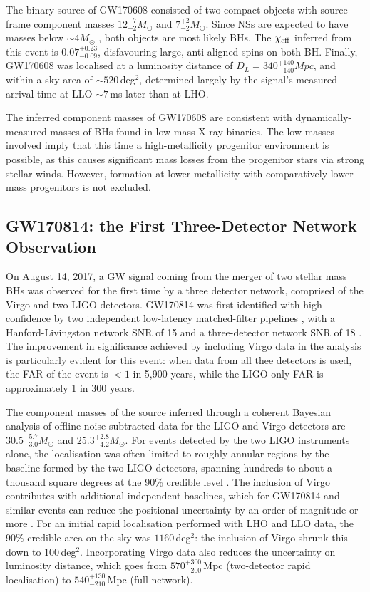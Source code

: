 \documentclass[binding=0.6cm, LaM]{sapthesis}
\begin{document}
	The binary source of GW170608 consisted of two compact objects with source-frame component masses 
	$12^{+7}_{-2}M_\odot$ and $7^{+2}_{-2}M_\odot$.
	Since NSs are expected to have masses below $\sim 4M_\odot$ \cite{141},
	both objects are most likely BHs. 
	The $\chi_{\rm eff}$ inferred from this event is $0.07^{+0.23}_{−0.09}$,
	disfavouring large, anti-aligned spins on both BH.
        Finally, GW170608 was localised at a luminosity distance of $D_L = 340^{+140}_{−140}Mpc$, 
	and within a sky area of $\sim 520\,$deg$^2$, determined largely by the signal's measured arrival time at LLO $\sim 7$\,ms later than at LHO.
 
	The inferred component masses of GW170608 are consistent with 
	dynamically-measured masses of BHs found in low-mass X-ray binaries.
	The low masses involved imply that this time a high-metallicity progenitor environment is possible, 
	as this causes significant mass losses from the progenitor stars via strong stellar winds.
	However, formation at lower metallicity with comparatively lower mass progenitors is not excluded.

\subsection{GW170814: the First Three-Detector Network Observation}	
	On August 14, 2017, a GW signal coming from the merger of two stellar mass BHs 
	was observed for the first time by a three detector network, comprised of the Virgo and two LIGO detectors. 
	GW170814 was first identified with high confidence by two independent 
	low-latency matched-filter pipelines \cite{111,112,114,146},
	with a Hanford-Livingston network SNR of 15 and a three-detector network SNR of 18 \cite{114,150,151}.
	The improvement in significance achieved by including Virgo data in the analysis is particularly evident 
	for this event: when data from all thee detectors is used, 
	the FAR of the event is $< 1$ in 5,900 years, while the LIGO-only FAR is approximately 1 in 300 years.

	The component masses of the source inferred through a coherent Bayesian analysis \cite{93, 152} 
	of offline noise-subtracted data for the LIGO and Virgo detectors 
        are $30.5^{+5.7}_{-3.0}M_\odot$ and $25.3^{+2.8}_{-4.2}M_\odot$.
	For events detected by the two LIGO instruments alone, the localisation 
	was often limited to roughly annular regions by the baseline formed by the two LIGO detectors,
	spanning hundreds to about a thousand square degrees at the 90\% credible level \cite{89,155,156}. 
	The inclusion of Virgo contributes with additional independent baselines, 
	which for GW170814 and similar events can reduce the positional uncertainty by an order of magnitude or more \cite{155}. 
	For an initial rapid localisation performed with LHO and LLO data, 
	the 90\% credible area on the sky was $1160\,$deg$^2$: the inclusion of Virgo shrunk this down to $100\,$deg$^2$.
	Incorporating Virgo data also reduces the uncertainty on luminosity distance, 
	which goes from $570^{+300}_{-200}\,$Mpc (two-detector rapid localisation) to $540^{+130}_{-210}\,$Mpc (full network).
\end{document}
